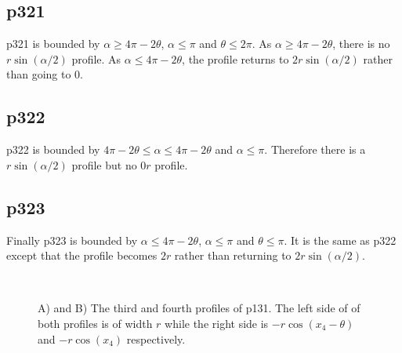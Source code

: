 \subsection{p321} \label{p321}

p321 is bounded by $\alpha \ge 4\pi - 2\theta$, $\alpha \le \pi$ and $\theta \le 2\pi$. As $\alpha \ge 4\pi - 2\theta$, there is no $r\sin(\alpha/2)$ profile. As $\alpha \le 4\pi - 2\theta$, the profile returns to $2r\sin(\alpha/2)$ rather than going to 0.



\subsection{p322} \label{p322}

p322 is bounded by $4\pi - 2\theta \le \alpha \le 4\pi - 2\theta$ and $\alpha \le \pi$. Therefore there is a $r\sin(\alpha/2)$ profile but no $0r$ profile.



\subsection{p323} \label{p323}

Finally p323 is bounded by  $\alpha \le 4\pi - 2\theta $, $\alpha\le\pi$ and $\theta \le \pi$. It is the same as p322 except that the profile becomes $2r$ rather than returning to $2r\sin(\alpha/2)$.




\begin{figure}[t]
        \centering
        \begin{subfigure}[t]{0.3\textwidth}
                \centering
                \caption{}
                \label{f:p131AT}
        \end{subfigure}
~ 
        \begin{subfigure}[t]{0.3\textwidth}
                \centering
                \caption{}
                \label{f:p131behindFull}
        \end{subfigure}
\caption{A) and B) The third and fourth profiles of p131. The left side of of both profiles is of width $r$ while the right side is $- r\cos(x_4 - \theta)$ and $- r\cos(x_4)$ respectively. }
\label{f:p131}
\end{figure}

